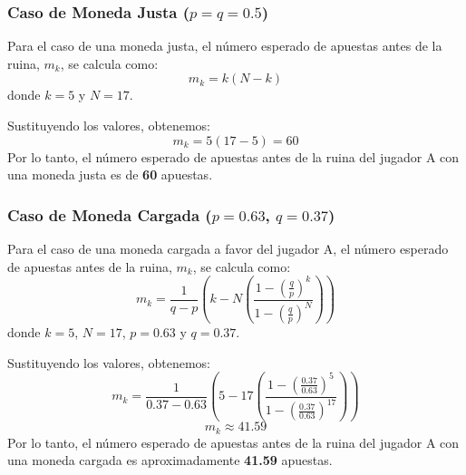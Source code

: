 \documentclass{article}
\begin{document}
\subsubsection*{Caso de Moneda Justa (\(p = q = 0.5\))}
Para el caso de una moneda justa, el número esperado de apuestas antes de la ruina, \(m_k\), se calcula como:
\[ m_k = k(N-k) \]
donde \(k = 5\) y \(N = 17\).

Sustituyendo los valores, obtenemos:
\[ m_k = 5(17-5) = 60 \]
Por lo tanto, el número esperado de apuestas antes de la ruina del jugador A con una moneda justa es de \textbf{60} apuestas.

\subsubsection*{Caso de Moneda Cargada (\(p = 0.63\), \(q = 0.37\))}
Para el caso de una moneda cargada a favor del jugador A, el número esperado de apuestas antes de la ruina, \(m_k\), se calcula como:
\[ m_k = \frac{1}{q-p}\left( k - N\left(\frac{1-\left(\frac{q}{p}\right)^k}{1-\left(\frac{q}{p}\right)^N}\right) \right) \]
donde \(k = 5\), \(N = 17\), \(p = 0.63\) y \(q = 0.37\).

Sustituyendo los valores, obtenemos:
\[ m_k = \frac{1}{0.37-0.63}\left( 5 - 17\left(\frac{1-\left(\frac{0.37}{0.63}\right)^5}{1-\left(\frac{0.37}{0.63}\right)^{17}}\right) \right) \]
\[ m_k \approx 41.59 \]
Por lo tanto, el número esperado de apuestas antes de la ruina del jugador A con una moneda cargada es aproximadamente \textbf{41.59} apuestas.


\vspace{0.25cm}
\end{document}
